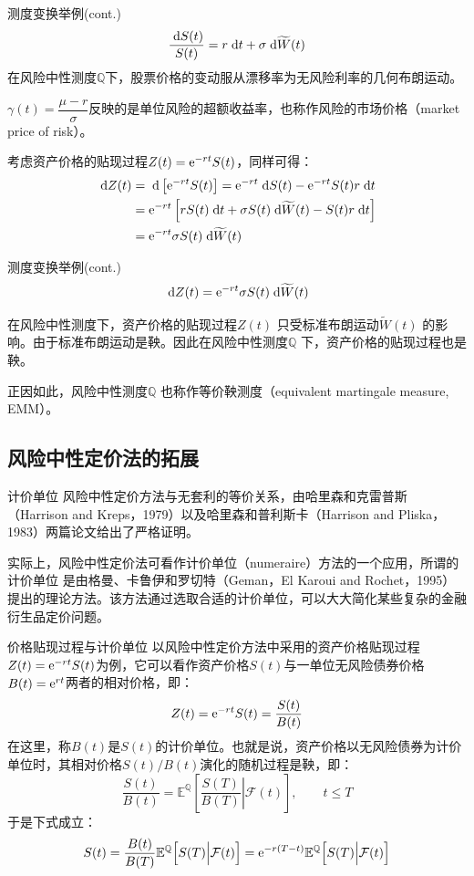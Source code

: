 \documentclass[t]{beamer}
\newcommand{\dif}{{\;\rm d}}
\newcommand{\EQ}{\mathbb{E}^{\mathbb{Q}}}
\begin{document}
\begin{frame}{测度变换举例(cont.)}
\[\frac{\dif S(t)}{S(t)}=r\dif t+\sigma\dif \widetilde{W}(t)\]	
在风险中性测度$\mathbb{Q}$下，股票价格的变动服从漂移率为无风险利率的几何布朗运动。

$\gamma(t)=\dfrac{\mu-r}{\sigma}$反映的是单位风险的超额收益率，也称作风险的市场价格（market price of risk）。

考虑资产价格的贴现过程$Z(t)={\rm e}^{-rt}S(t)$，同样可得：
\begin{equation*}
\begin{split}
\dif Z(t)&=\dif\left[ {\rm e}^{-rt}S(t)\right] ={\rm e}^{-rt}\dif S(t)-{\rm e}^{-rt}S(t)r\dif t\\
&={\rm e}^{-rt}\left[rS(t)\dif t+\sigma S(t)\dif \widetilde{W}(t) -S(t)r\dif t\right] \\
&={\rm e}^{-rt} \sigma S(t)\dif \widetilde{W}(t)
\end{split}
\end{equation*}
\end{frame}



\begin{frame}{测度变换举例(cont.)}
	\[\dif Z(t)={\rm e}^{-rt} \sigma S(t)\dif \widetilde{W}(t)\]
	
	在风险中性测度下，资产价格的贴现过程$Z(t)$ 只受标准布朗运动$\widetilde{W}(t)$ 的影响。由于标准布朗运动是鞅。因此在风险中性测度$\mathbb{Q}$ 下，资产价格的贴现过程也是鞅。
	
	正因如此，风险中性测度$\mathbb{Q}$ 也称作等价鞅测度（equivalent martingale measure, EMM）。

\end{frame}


\subsection{风险中性定价法的拓展}
\begin{frame}{计价单位}
风险中性定价方法与无套利的等价关系，由哈里森和克雷普斯（Harrison and  Kreps，1979）以及哈里森和普利斯卡（Harrison and Pliska，1983）两篇论文给出了严格证明。

实际上，风险中性定价法可看作计价单位（numeraire）方法的一个应用，所谓的计价单位
是由格曼、卡鲁伊和罗切特（Geman，El Karoui and Rochet，1995）提出的理论方法。该方法通过选取合适的计价单位，可以大大简化某些复杂的金融衍生品定价问题。
\end{frame}


\begin{frame}{价格贴现过程与计价单位}
	以风险中性定价方法中采用的资产价格贴现过程$Z(t)={\rm e}^{-rt}S(t)$为例，它可以看作资产价格$S(t)$与一单位无风险债券价格$B(t)={\rm e}^{rt}$两者的相对价格，即：
\[Z(t)={\rm e}^{-rt}S(t)=\frac{S(t)}{B(t)} \]
在这里，称$B(t)$是$S(t)$的计价单位。也就是说，资产价格以无风险债券为计价单位时，其相对价格$S(t)/B(t)$演化的随机过程是鞅，即：
\[
\frac{S(t)}{B(t)}=\EQ\left[\left.\frac{S(T)}{B(T)}\right|\mathcal{F}(t)\right],\qquad t\le T
\]
于是下式成立：
\[S(t)=\frac{B(t)}{B(T)}\EQ\Big[S(T)\Big|\mathcal{F}(t)\Big]={\rm e}^{-r(T-t)}\EQ\Big[S(T)\Big|\mathcal{F}(t)\Big]\]
\end{frame}
\end{document}
